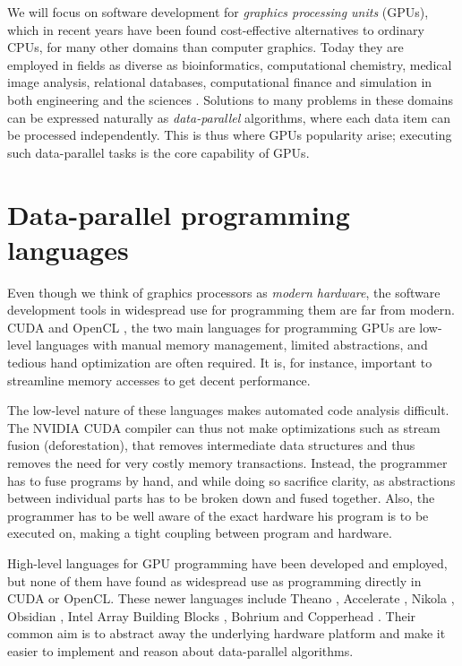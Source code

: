 We will focus on software development for \emph{graphics processing
  units} (GPUs), which in recent years have been found cost-effective
alternatives to ordinary CPUs, for many other domains than computer
graphics. Today they are employed in fields as diverse as
bioinformatics, computational chemistry, medical image analysis,
relational databases, computational finance and simulation in both
engineering and the sciences \cite{hwy2011emerald, hwu2011jade,
  owens2007survey}. Solutions to many problems in these domains can be
expressed naturally as \emph{data-parallel} algorithms, where each
data item can be processed independently. This is thus where GPUs
popularity arise; executing such data-parallel tasks is the core
capability of GPUs.


\section{Data-parallel programming languages}
Even though we think of graphics processors as \emph{modern
  hardware}, the software development tools in widespread use for
programming them are far from modern. CUDA
\cite{nvidia2012programming} and OpenCL \cite{munshi2011opencl}, the
two main languages for programming GPUs are low-level languages with
manual memory management, limited abstractions, and tedious hand
optimization are often required. It is, for instance, important to
streamline memory accesses to get decent performance. 

The low-level nature of these languages makes automated code analysis
difficult. The NVIDIA CUDA compiler can thus not make optimizations
such as stream fusion (deforestation), that removes intermediate data
structures and thus removes the need for very costly memory
transactions. Instead, the programmer has to fuse programs by hand,
and while doing so sacrifice clarity, as abstractions between
individual parts has to be broken down and fused together. Also, the
programmer has to be well aware of the exact hardware his program is
to be executed on, making a tight coupling between program and
hardware.

High-level languages for GPU programming have been developed and
employed, but none of them have found as widespread use as programming
directly in CUDA or OpenCL. These newer languages include Theano
\cite{bergstra2010theano}, Accelerate
\cite{chakravarty2011accelerating}, Nikola \cite{mainland2010nikola},
Obsidian \cite{svensson2011obsidian}, Intel Array Building Blocks
\cite{newburn2011intel}, Bohrium \cite{homepage:bohrium} and
Copperhead \cite{Catanzaro2011}. Their common aim is to abstract away
the underlying hardware platform and make it easier to implement
and reason about data-parallel algorithms.

